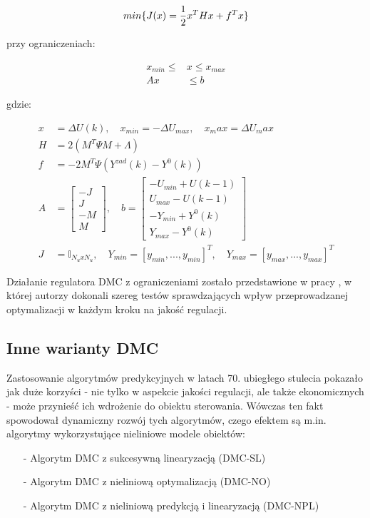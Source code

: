 \begin{equation}
min \{J(x) = \frac{1}{2} x^T Hx + f^T x\} \\
\end{equation} 

\noindent przy ograniczeniach:

\begin{equation}
\begin{aligned}
x_{min} \leq &x \leq x_{max} \\
Ax &\leq b
\end{aligned}
\end{equation}

\newpage

\noindent gdzie:

\begin{equation}
\begin{aligned}
x &= \Delta U(k), \quad x_{min} = -\Delta U_{max}, \quad x_max = \Delta U_max \\
H &= 2(M^T \Psi M + \Lambda) \\
f &= -2M^T \Psi (Y^{zad}(k) - Y^0(k)) \\
A &= \begin{bmatrix}
-J \\ J \\ -M \\ M
\end{bmatrix}, \quad
b = \begin{bmatrix}
-U_{min} + U(k-1) \\ U_{max} - U(k-1) \\ 
-Y_{min} + Y^0(k) \\ Y_{max} - Y^0(k) 	 	
\end{bmatrix} \\
J &= \mathbb{I}_{N_u x N_u}, \quad Y_{min} = [y_{min}, ..., y_{min}]^T, \quad Y_{max} = [y_{max}, ..., y_{max}]^T
\end{aligned}
\end{equation}

Działanie regulatora DMC z ograniczeniami zostało przedstawione w pracy \cite{50}, w której autorzy dokonali szereg testów sprawdzających wpływ przeprowadzanej optymalizacji w każdym kroku na jakość regulacji.

\subsection{Inne warianty DMC}
Zastosowanie algorytmów predykcyjnych w latach 70. ubiegłego stulecia pokazało jak duże korzyści - nie tylko w aspekcie jakości regulacji, ale także ekonomicznych - może przynieść ich wdrożenie do obiektu sterowania. Wówczas ten fakt spowodował dynamiczny rozwój tych algorytmów, czego efektem są m.in. algorytmy wykorzystujące nieliniowe modele obiektów:
\begin{itemize}
\item[-] Algorytm DMC z sukcesywną linearyzacją (DMC-SL)
\item[-] Algorytm DMC z nieliniową optymalizacją (DMC-NO)
\item[-] Algorytm DMC z nieliniową predykcją i linearyzacją (DMC-NPL)
\end{itemize}


